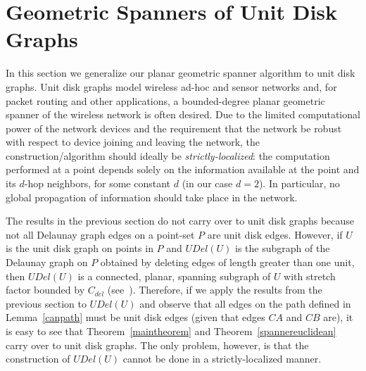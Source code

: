 \documentclass{stacs_proc}
\theoremstyle{plain}\newtheorem{satz}[thm]{Satz}
\begin{document}
\section{Geometric Spanners of Unit Disk Graphs}
  \label{structresults}  In this section we generalize our planar geometric
spanner algorithm to unit disk graphs. Unit disk graphs model wireless ad-hoc
and sensor networks and, for packet routing and other applications, a
bounded-degree planar geometric spanner of the wireless network is often
desired. Due to the limited computational power of the network devices and
the requirement that the network be robust with respect to device joining
and leaving the network, the construction/algorithm should ideally be
{\em strictly-localized}: the computation performed at a point depends solely
on the information available at the point and its $d$-hop neighbors, for some
constant $d$ (in our case $d=2$). In particular, no global propagation of
information should take place in the network.

The results in the previous section do not carry over to unit disk graphs
because not all Delaunay graph edges on a point-set $P$ are
unit disk edges. However, if $U$ is the unit disk graph on points in $P$ and
$UDel(U)$ is the subgraph of the Delaunay graph on $P$ obtained by deleting
edges of length greater than one unit, then $UDel(U)$ is a connected,
planar, spanning subgraph of $U$ with stretch factor bounded by $C_{del}$
(see~\cite{iitunbounded1, BoseMNSZ04}). Therefore, if we apply the results
from the previous section to
$UDel(U)$ and observe that all edges on the path defined in
Lemma~\ref{canpath} must be unit disk edges (given that edges $CA$
and $CB$ are), it is easy to see that Theorem~\ref{maintheorem} and
Theorem~\ref{spannereuclidean} carry over to unit disk graphs. The
only problem, however, is that the construction of $UDel(U)$ cannot
be done in a strictly-localized manner.
\end{document}
